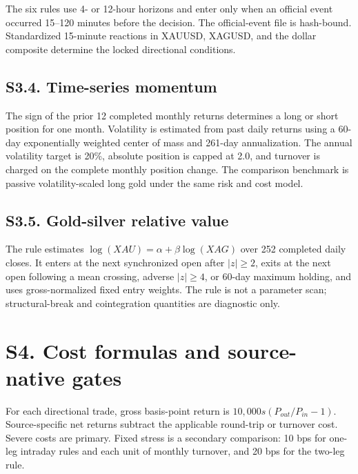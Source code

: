 \documentclass[a4paper,fleqn]{cas-sc}
\begin{document}
The six rules use 4- or 12-hour horizons and enter only when an official event occurred 15--120 minutes before the decision. The official-event file is hash-bound. Standardized 15-minute reactions in XAUUSD, XAGUSD, and the dollar composite determine the locked directional conditions.

\subsection*{S3.4. Time-series momentum}

The sign of the prior 12 completed monthly returns determines a long or short position for one month. Volatility is estimated from past daily returns using a 60-day exponentially weighted center of mass and 261-day annualization. The annual volatility target is 20\%, absolute position is capped at 2.0, and turnover is charged on the complete monthly position change. The comparison benchmark is passive volatility-scaled long gold under the same risk and cost model.

\subsection*{S3.5. Gold-silver relative value}

The rule estimates $\log(XAU)=\alpha+\beta\log(XAG)$ over 252 completed daily closes. It enters at the next synchronized open after $|z|\ge2$, exits at the next open following a mean crossing, adverse $|z|\ge4$, or 60-day maximum holding, and uses gross-normalized fixed entry weights. The rule is not a parameter scan; structural-break and cointegration quantities are diagnostic only.

\section*{S4. Cost formulas and source-native gates}

For each directional trade, gross basis-point return is $10{,}000s(P_{out}/P_{in}-1)$. Source-specific net returns subtract the applicable round-trip or turnover cost. Severe costs are primary. Fixed stress is a secondary comparison: 10 bps for one-leg intraday rules and each unit of monthly turnover, and 20 bps for the two-leg rule.
\end{document}
